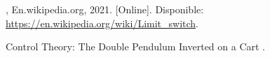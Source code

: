 %

%

\begin{flushleft}
\begin{thebibliography}{9}

, En.wikipedia.org, 2021. [Online]. Disponible: \href{https://en.wikipedia.org/wiki/Limit\_switch}{https://en.wikipedia.org/wiki/Limit\_switch}. 

Control Theory: The Double Pendulum Inverted on a Cart
.
\end{thebibliography}
\end{flushleft}

%

